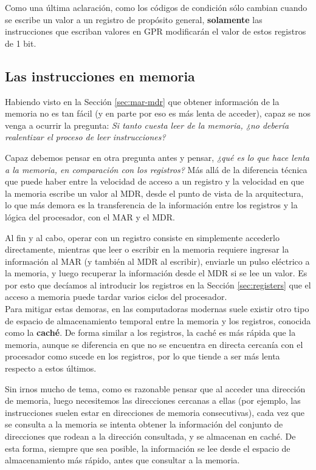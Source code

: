 \documentclass[a4paper, titlepage]{report}
\begin{document}
	Como una última aclaración, como los códigos de condición sólo cambian cuando se escribe un valor a un registro de propósito general, \textbf{solamente} las instrucciones que escriban valores en GPR modificarán el valor de estos registros de 1 bit.
	
	\subsection{Las instrucciones en memoria}
	
	Habiendo visto en la Sección \ref{sec:mar-mdr} que obtener información de la memoria no es tan fácil (y en parte por eso es más lenta de acceder), capaz se nos venga a ocurrir la pregunta: \textit{Si tanto cuesta leer de la memoria, ¿no debería realentizar el proceso de leer instrucciones?}
	
	Capaz debemos pensar en otra pregunta antes y pensar, \textit{¿qué es lo que hace lenta a la memoria, en comparación con los registros?} Más allá de la diferencia técnica que puede haber entre la velocidad de acceso a un registro y la velocidad en que la memoria escribe un valor al MDR, desde el punto de vista de la arquitectura, lo que más demora es la transferencia de la información entre los registros y la lógica del procesador, con el MAR y el MDR.
	
	Al fin y al cabo, operar con un registro consiste en simplemente accederlo directamente, mientras que leer o escribir en la memoria requiere ingresar la información al MAR (y también al MDR al escribir), enviarle un pulso eléctrico a la memoria, y luego recuperar la información desde el MDR si se lee un valor. Es por esto que decíamos al introducir los registros en la Sección \ref{sec:registers} que el acceso a memoria puede tardar varios ciclos del procesador.\\
	
	Para mitigar estas demoras, en las computadoras modernas suele existir otro tipo de espacio de almacenamiento temporal entre la memoria y los registros, conocida como la \textbf{caché}. De forma similar a los registros, la caché es más rápida que la memoria, aunque se diferencia en que no se encuentra en directa cercanía con el procesador como sucede en los registros, por lo que tiende a ser más lenta respecto a estos últimos.
	
	Sin irnos mucho de tema, como es razonable pensar que al acceder una dirección de memoria, luego necesitemos las direcciones cercanas a ellas (por ejemplo, las instrucciones suelen estar en direcciones de memoria consecutivas), cada vez que se consulta a la memoria se intenta obtener la información del conjunto de direcciones que rodean a la dirección consultada, y se almacenan en caché. De esta forma, siempre que sea posible, la información se lee desde el espacio de almacenamiento más rápido, antes que consultar a la memoria.
	
\end{document}
